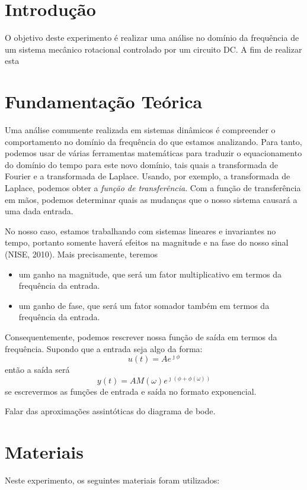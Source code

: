 \documentclass[a4paper,12pt]{article}
\title{\tituloRelatorio}
\begin{document}

\newpage
\tableofcontents
\thispagestyle{empty}
\newpage

\section{Introdução}
O objetivo deste experimento é realizar uma análise no domínio da frequência de um sistema mecânico rotacional controlado por um circuito DC. A fim de realizar esta

\section{Fundamentação Teórica}
Uma análise comumente realizada em sistemas dinâmicos é compreender o comportamento no domínio da frequência do que estamos analizando. Para tanto, podemos usar de várias ferramentas matemáticas para traduzir o equacionamento do domínio do tempo para este novo domínio, tais quais a transformada de Fourier e a transformada de Laplace. Usando, por exemplo, a transformada de Laplace, podemos obter a \textit{função de transferência}. Com a função de transferência em mãos, podemos determinar quais as mudanças que o nosso sistema causará a uma dada entrada.

No nosso caso, estamos trabalhando com sistemas lineares e invariantes no tempo, portanto somente haverá efeitos na magnitude e na fase do nosso sinal (NISE, 2010). Mais precisamente, teremos
\begin{itemize}
    \item um ganho na magnitude, que será um fator multiplicativo em termos da frequência da entrada.
    \item um ganho de fase, que será um fator somador também em termos da frequência da entrada.
\end{itemize}
Consequentemente, podemos rescrever nossa função de saída em termos da frequência. Supondo que a entrada seja algo da forma: $$ u(t) = A e^{\jmath \phi} $$ então a saída será $$ y(t) = A M(\omega) e^{\jmath (\phi + \phi (\omega))}$$ se escrevermos as funções de entrada e saída no formato exponencial.

Falar das aproximações assintóticas do diagrama de bode.

\section{Materiais}
Neste experimento, os seguintes materiais foram utilizados:
\end{document}
